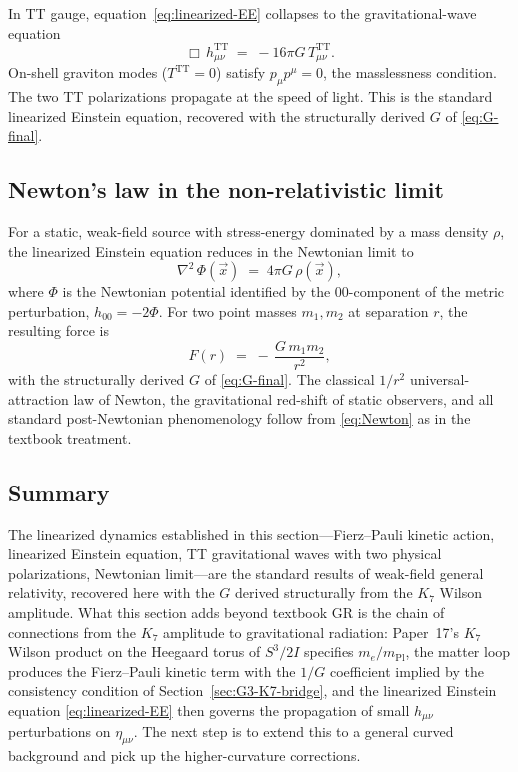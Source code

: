 \documentclass[11pt]{article}
\newcommand{\mPl}{m_{\mathrm{Pl}}}
\newcommand{\me}{m_e}
\begin{document}
In TT gauge, equation~\eqref{eq:linearized-EE} collapses to the
gravitational-wave equation
\begin{equation}
  \boxed{\;
    \Box\,h^{\mathrm{TT}}_{\mu\nu}
     \;=\;
     -16\pi G\,T^{\mathrm{TT}}_{\mu\nu}.
  \;}
  \label{eq:GW-equation}
\end{equation}
On-shell graviton modes ($T^{\mathrm{TT}} = 0$) satisfy
$p_\mu p^\mu = 0$, the masslessness condition.  The two TT
polarizations propagate at the speed of light.  This is the
standard linearized Einstein equation, recovered with the
structurally derived $G$ of \eqref{eq:G-final}.

\subsection{Newton's law in the non-relativistic limit}

For a static, weak-field source with stress-energy dominated by a
mass density $\rho$, the linearized Einstein equation reduces in
the Newtonian limit to
\begin{equation}
  \nabla^2\,\Phi(\vec x)
   \;=\;
   4\pi G\,\rho(\vec x),
  \label{eq:Newton}
\end{equation}
where $\Phi$ is the Newtonian potential identified by the
$00$-component of the metric perturbation,
$h_{00} = -2\Phi$.  For two point masses $m_1, m_2$ at separation
$r$, the resulting force is
\begin{equation}
  F(r)
   \;=\;
   -\,\frac{G\,m_1 m_2}{r^2},
\end{equation}
with the structurally derived $G$ of \eqref{eq:G-final}.  The
classical $1/r^2$ universal-attraction law of Newton, the
gravitational red-shift of static observers, and all standard
post-Newtonian phenomenology follow from \eqref{eq:Newton} as in
the textbook treatment.

\subsection{Summary}

The linearized dynamics established in this section---Fierz--Pauli
kinetic action, linearized Einstein equation, TT gravitational
waves with two physical polarizations, Newtonian limit---are the
standard results of weak-field general relativity, recovered here
with the $G$ derived structurally from the $K_7$ Wilson amplitude.
What this section adds beyond textbook GR is the chain of
connections from the $K_7$ amplitude to gravitational radiation:
Paper~17's $K_7$ Wilson product on the Heegaard torus of $S^3/2I$
specifies $\me/\mPl$, the matter loop produces the Fierz--Pauli
kinetic term with the $1/G$ coefficient implied by the consistency
condition of Section~\ref{sec:G3-K7-bridge}, and the linearized
Einstein equation \eqref{eq:linearized-EE} then governs the
propagation of small $h_{\mu\nu}$ perturbations on $\eta_{\mu\nu}$.
The next step is to extend this to a general curved background and
pick up the higher-curvature corrections.
\end{document}
